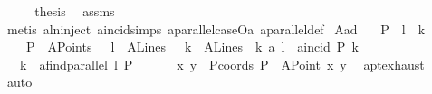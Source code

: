 \begin{isabellebody}
%
\isadelimproof
%
\endisadelimproof
%
\isatagproof
{}\isamarkupfalse%
\ {\isacharminus}{\kern0pt}\isanewline
\ \ \isamarkupfalse%
\ {\isacharquery}{\kern0pt}thesis\ \isamarkupfalse%
\ assms\isanewline
\ \ \isamarkupfalse%
\ {\isacharparenleft}{\kern0pt}metis\ a{}ln{\isachardot}{\kern0pt}inject{\isacharparenleft}{\kern0pt}{}{\isacharparenright}{\kern0pt}\ a{}incid{\isachardot}{\kern0pt}simps{\isacharparenleft}{\kern0pt}{}{\isacharparenright}{\kern0pt}\ a{}parallel{\isacharunderscore}{\kern0pt}caseOa{\isacharparenleft}{\kern0pt}{}{\isacharparenright}{\kern0pt}\ a{}parallel{\isacharunderscore}{\kern0pt}def{\isacharparenright}{\kern0pt}\isanewline
{}\isamarkupfalse%
%
\endisatagproof
{\isafoldproof}%
%
\isadelimproof
\isanewline
%
\endisadelimproof
\isanewline
\isanewline
\isanewline
{}\isamarkupfalse%
\ A{}{\isacharunderscore}{\kern0pt}a{}d{\isacharcolon}{\kern0pt}\isanewline
\ \ \ P\ \ l\ \ k\ \isanewline
\ \ \ \ {\isachardoublequoteopen}P\ {\isasymin}\ A{}Points{\isachardoublequoteclose}\ \ \ {\isachardoublequoteopen}l\ {\isasymin}\ A{}Lines{\isachardoublequoteclose}\ \ \ {\isachardoublequoteopen}k\ {\isasymin}\ A{}Lines{\isachardoublequoteclose}\ \ {\isachardoublequoteopen}k\ a{}{\isacharbar}{\kern0pt}{\isacharbar}{\kern0pt}\ l{\isachardoublequoteclose}\ \ {\isachardoublequoteopen}a{}incid\ P\ k{\isachardoublequoteclose}\isanewline
\ \ \ {\isachardoublequoteopen}k\ {\isacharequal}{\kern0pt}\ a{}find{\isacharunderscore}{\kern0pt}parallel\ l\ P{\isachardoublequoteclose}\isanewline
%
\isadelimproof
%
\endisadelimproof
%
\isatagproof
{}\isamarkupfalse%
\ {\isacharminus}{\kern0pt}\ \isanewline
\ \ \isamarkupfalse%
\ x{}\ y{}\ \ Pcoords{\isacharcolon}{\kern0pt}\ {\isachardoublequoteopen}P\ {\isacharequal}{\kern0pt}\ {\isacharparenleft}{\kern0pt}A{}Point\ x{}\ y{}{\isacharparenright}{\kern0pt}{\isachardoublequoteclose}\ \isamarkupfalse%
\ a{}pt{\isachardot}{\kern0pt}exhaust\ \isamarkupfalse%
\ auto\isanewline
\ \ \isamarkupfalse%

\end{isabellebody}
